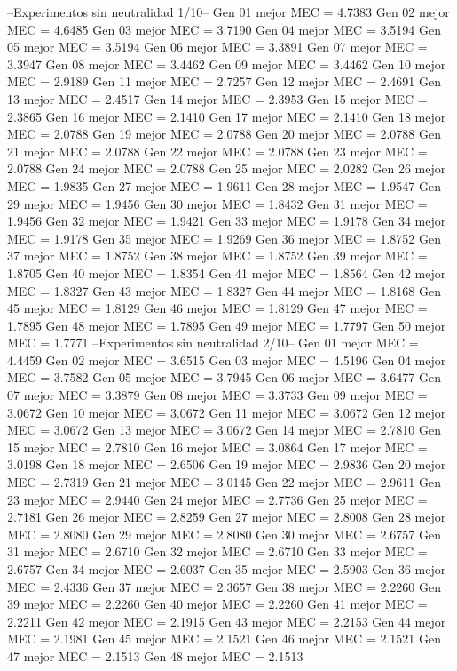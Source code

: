 --Experimentos sin neutralidad 1/10--
Gen 01 mejor MEC = 4.7383
Gen 02 mejor MEC = 4.6485
Gen 03 mejor MEC = 3.7190
Gen 04 mejor MEC = 3.5194
Gen 05 mejor MEC = 3.5194
Gen 06 mejor MEC = 3.3891
Gen 07 mejor MEC = 3.3947
Gen 08 mejor MEC = 3.4462
Gen 09 mejor MEC = 3.4462
Gen 10 mejor MEC = 2.9189
Gen 11 mejor MEC = 2.7257
Gen 12 mejor MEC = 2.4691
Gen 13 mejor MEC = 2.4517
Gen 14 mejor MEC = 2.3953
Gen 15 mejor MEC = 2.3865
Gen 16 mejor MEC = 2.1410
Gen 17 mejor MEC = 2.1410
Gen 18 mejor MEC = 2.0788
Gen 19 mejor MEC = 2.0788
Gen 20 mejor MEC = 2.0788
Gen 21 mejor MEC = 2.0788
Gen 22 mejor MEC = 2.0788
Gen 23 mejor MEC = 2.0788
Gen 24 mejor MEC = 2.0788
Gen 25 mejor MEC = 2.0282
Gen 26 mejor MEC = 1.9835
Gen 27 mejor MEC = 1.9611
Gen 28 mejor MEC = 1.9547
Gen 29 mejor MEC = 1.9456
Gen 30 mejor MEC = 1.8432
Gen 31 mejor MEC = 1.9456
Gen 32 mejor MEC = 1.9421
Gen 33 mejor MEC = 1.9178
Gen 34 mejor MEC = 1.9178
Gen 35 mejor MEC = 1.9269
Gen 36 mejor MEC = 1.8752
Gen 37 mejor MEC = 1.8752
Gen 38 mejor MEC = 1.8752
Gen 39 mejor MEC = 1.8705
Gen 40 mejor MEC = 1.8354
Gen 41 mejor MEC = 1.8564
Gen 42 mejor MEC = 1.8327
Gen 43 mejor MEC = 1.8327
Gen 44 mejor MEC = 1.8168
Gen 45 mejor MEC = 1.8129
Gen 46 mejor MEC = 1.8129
Gen 47 mejor MEC = 1.7895
Gen 48 mejor MEC = 1.7895
Gen 49 mejor MEC = 1.7797
Gen 50 mejor MEC = 1.7771
--Experimentos sin neutralidad 2/10--
Gen 01 mejor MEC = 4.4459
Gen 02 mejor MEC = 3.6515
Gen 03 mejor MEC = 4.5196
Gen 04 mejor MEC = 3.7582
Gen 05 mejor MEC = 3.7945
Gen 06 mejor MEC = 3.6477
Gen 07 mejor MEC = 3.3879
Gen 08 mejor MEC = 3.3733
Gen 09 mejor MEC = 3.0672
Gen 10 mejor MEC = 3.0672
Gen 11 mejor MEC = 3.0672
Gen 12 mejor MEC = 3.0672
Gen 13 mejor MEC = 3.0672
Gen 14 mejor MEC = 2.7810
Gen 15 mejor MEC = 2.7810
Gen 16 mejor MEC = 3.0864
Gen 17 mejor MEC = 3.0198
Gen 18 mejor MEC = 2.6506
Gen 19 mejor MEC = 2.9836
Gen 20 mejor MEC = 2.7319
Gen 21 mejor MEC = 3.0145
Gen 22 mejor MEC = 2.9611
Gen 23 mejor MEC = 2.9440
Gen 24 mejor MEC = 2.7736
Gen 25 mejor MEC = 2.7181
Gen 26 mejor MEC = 2.8259
Gen 27 mejor MEC = 2.8008
Gen 28 mejor MEC = 2.8080
Gen 29 mejor MEC = 2.8080
Gen 30 mejor MEC = 2.6757
Gen 31 mejor MEC = 2.6710
Gen 32 mejor MEC = 2.6710
Gen 33 mejor MEC = 2.6757
Gen 34 mejor MEC = 2.6037
Gen 35 mejor MEC = 2.5903
Gen 36 mejor MEC = 2.4336
Gen 37 mejor MEC = 2.3657
Gen 38 mejor MEC = 2.2260
Gen 39 mejor MEC = 2.2260
Gen 40 mejor MEC = 2.2260
Gen 41 mejor MEC = 2.2211
Gen 42 mejor MEC = 2.1915
Gen 43 mejor MEC = 2.2153
Gen 44 mejor MEC = 2.1981
Gen 45 mejor MEC = 2.1521
Gen 46 mejor MEC = 2.1521
Gen 47 mejor MEC = 2.1513
Gen 48 mejor MEC = 2.1513
